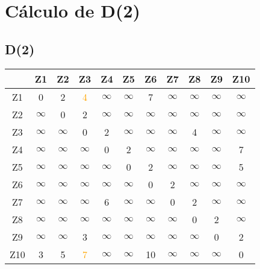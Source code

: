\documentclass[a4paper,11pt]{article}
\begin{document}
\section*{Cálculo de D(2)}
\subsection*{D(2)}
\begin{center}
\begin{tabular}{c|cccccccccc}
 & Z1 & Z2 & Z3 & Z4 & Z5 & Z6 & Z7 & Z8 & Z9 & Z10 \\ \hline
Z1 & 0 & 2 & \textcolor{orange}{4} & $\infty$ & $\infty$ & 7 & $\infty$ & $\infty$ & $\infty$ & $\infty$ \\
Z2 & $\infty$ & 0 & 2 & $\infty$ & $\infty$ & $\infty$ & $\infty$ & $\infty$ & $\infty$ & $\infty$ \\
Z3 & $\infty$ & $\infty$ & 0 & 2 & $\infty$ & $\infty$ & $\infty$ & 4 & $\infty$ & $\infty$ \\
Z4 & $\infty$ & $\infty$ & $\infty$ & 0 & 2 & $\infty$ & $\infty$ & $\infty$ & $\infty$ & 7 \\
Z5 & $\infty$ & $\infty$ & $\infty$ & $\infty$ & 0 & 2 & $\infty$ & $\infty$ & $\infty$ & 5 \\
Z6 & $\infty$ & $\infty$ & $\infty$ & $\infty$ & $\infty$ & 0 & 2 & $\infty$ & $\infty$ & $\infty$ \\
Z7 & $\infty$ & $\infty$ & $\infty$ & 6 & $\infty$ & $\infty$ & 0 & 2 & $\infty$ & $\infty$ \\
Z8 & $\infty$ & $\infty$ & $\infty$ & $\infty$ & $\infty$ & $\infty$ & $\infty$ & 0 & 2 & $\infty$ \\
Z9 & $\infty$ & $\infty$ & 3 & $\infty$ & $\infty$ & $\infty$ & $\infty$ & $\infty$ & 0 & 2 \\
Z10 & 3 & 5 & \textcolor{orange}{7} & $\infty$ & $\infty$ & 10 & $\infty$ & $\infty$ & $\infty$ & 0 \\
\end{tabular}
\end{center}
\end{document}

